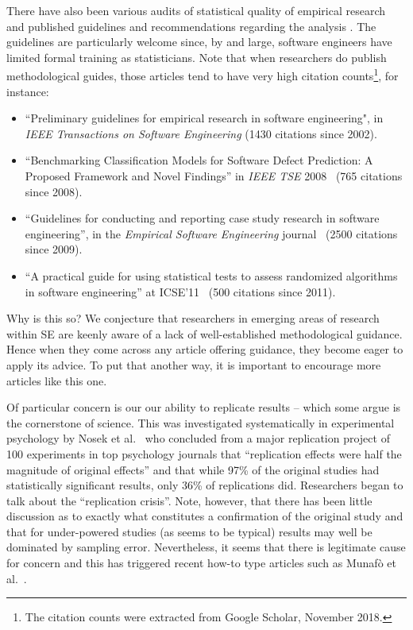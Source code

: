\documentclass[preprint,10pt]{elsarticle}
\newcommand{\bi}{\begin{itemize}}
\newcommand{\ei}{\end{itemize}}
\begin{document}
There have also been various audits of statistical quality of empirical research \cite{Kitc02} and published guidelines and recommendations regarding the analysis \cite{Kitc02,Wohl12}. The guidelines are particularly welcome since, by and large, software engineers have limited formal training as statisticians.  Note that when researchers do publish methodological guides, those articles tend to have very high citation counts\footnote{The citation counts were extracted from Google Scholar, November 2018.}, for instance:
\bi
\item ``Preliminary guidelines for empirical research in software engineering", in \textit{IEEE Transactions on Software Engineering} \cite{Kitc02} (1430 citations since 2002).
\item ``Benchmarking Classification Models for Software Defect Prediction: A Proposed Framework and Novel Findings'' in \textit{IEEE TSE} 2008~\cite{Lessmann08} (765 citations since 2008).
\item
``Guidelines for conducting and reporting case study research in software engineering'', 
  in the \textit{Empirical Software Engineering} journal~\cite{runeson2009guidelines} (2500 citations since 2009).
\item ``A practical guide for using statistical tests to assess randomized algorithms in software engineering'' at ICSE'11~\cite{Arcuri:2011} (500 citations since 2011).
\ei
Why is this so?  We conjecture that researchers in emerging areas of research within SE are keenly aware of a lack of well-established methodological guidance. Hence when they come across any article offering  guidance, they become eager to apply its advice.  To put that another way, it is important to encourage more articles like this one.

Of particular concern is our our ability to replicate results -- which some argue is the cornerstone of science.  This was investigated systematically in experimental psychology by Nosek et al.~\cite{Open15} who concluded from a major replication project of 100 experiments in top psychology journals that ``replication effects were half the magnitude of original effects'' and that while 97\% of the original studies had statistically significant results, only 36\% of replications did.  Researchers began to talk about the ``replication crisis''.  Note, however, that there has been little discussion as to exactly what constitutes a confirmation of the original study \cite{Spen16} and that for under-powered studies (as seems to be typical) results may well be dominated by sampling error.  Nevertheless, it seems that there is legitimate cause for concern and this has triggered recent how-to type articles such as Munaf{\`o} et al.~\cite{Muna17}.
\end{document}
